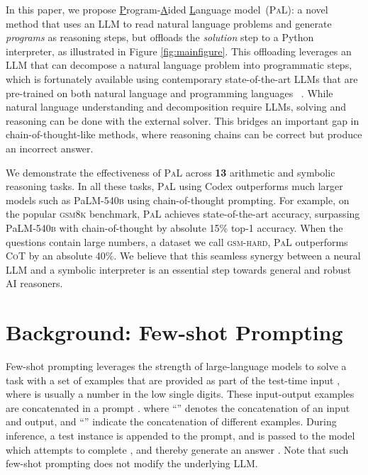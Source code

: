 \documentclass[dvipsnames]{article} \usepackage[accepted]{icml2022}
\newcommand{\ours}{\textsc{PaL}\xspace}
\newcommand{\prompt}{\xspace}
\newcommand{\cotp}{\textsc{CoT}\xspace}
\newcommand{\llm}{LLM\xspace}
\newcommand{\gsm}{\textsc{gsm8k}\xspace}
\newcommand{\gsmhard}{\textsc{gsm-hard}\xspace}
\newcommand{\largepalm}{\textsc{P}a\textsc{LM}\textsc{-540b}\xspace}
\begin{document}
In this paper, we propose \underline{P}rogram-\underline{A}ided \underline{L}anguage model~(\ours): a novel method that uses an LLM to read natural language problems and generate \emph{programs} as reasoning steps, but offloads the \emph{solution} step to a Python interpreter, as illustrated in Figure \ref{fig:mainfigure}. 
This offloading leverages an LLM that can decompose a natural language problem into programmatic steps, which is fortunately available using contemporary state-of-the-art \llm{s} that are pre-trained on both natural language and programming languages ~\citep{brown2020language,codex,palm:arxiv}.
While natural language understanding and decomposition require LLMs, solving and reasoning can be done with the external solver.
This bridges an important gap in chain-of-thought-like methods, where reasoning chains can be correct but produce an incorrect answer.





We demonstrate the effectiveness of \ours across \textbf{13} arithmetic and symbolic reasoning tasks. In all these tasks, \ours using Codex \citep{codex} outperforms much larger models such as \largepalm using chain-of-thought prompting.
For example, on the popular \gsm benchmark, \ours achieves state-of-the-art accuracy, surpassing \largepalm with chain-of-thought by absolute 15\% top-1 accuracy. 
When the questions contain large numbers,
a dataset we call \gsmhard, \ours outperforms \cotp by an absolute 40\%.
We believe that this seamless synergy between a neural \llm and a symbolic interpreter is an essential step towards general and robust AI reasoners.
 



\newcommand{\nl}{NL\xspace}
\newcommand{\pl}{PL\xspace}



\section{Background: Few-shot Prompting} 
Few-shot prompting leverages the strength of large-language models to solve a task with a set of  examples that are provided as part of the test-time input \citep{brown2020language,liu2021pre,palm:arxiv}, where  is usually a number in the low single digits.
These input-output examples  are concatenated in a prompt \prompt .
where ``'' denotes the concatenation of an input and output, and ``'' indicate the concatenation of different examples.
During inference, a test instance  is appended to the prompt, and  is passed to the model which attempts to complete , and thereby generate an answer .
Note that such few-shot prompting does not modify the underlying \llm.
\end{document}
